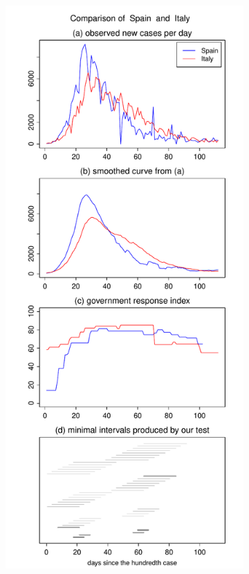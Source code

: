 \documentclass[a4paper,12pt]{article}
\numberwithin{equation}{section}
\begin{document}
\begin{figure}[t!]\ContinuedFloat
\begin{subfigure}[b]{0.475\textwidth}
\includegraphics[width=\textwidth]{plots/ESP_vs_ITA}

\end{subfigure}
\end{figure}
\end{document}
